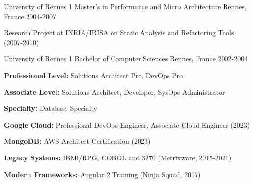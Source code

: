 
\begin{cventries}
\cventry
{University of Rennes 1} %
{Master's in Performance and Micro Architecture} %
{Rennes, France} %
{2004-2007} %
{
  \begin{cvitems}
    \item Research Project at INRIA/IRISA on Static Analysis and Refactoring Tools (2007-2010)
  \end{cvitems}
}
\cventry
{University of Rennes 1} %
{Bachelor of Computer Sciences} %
{Rennes, France} %
{2002-2004} %
{
}
\end{cventries}

\vspace{-2mm}
\begin{cvitems}
\item \textbf{Professional Level:} Solutions Architect Pro, DevOps Pro
\item \textbf{Associate Level:} Solutions Architect, Developer, SysOps Administrator  
\item \textbf{Specialty:} Database Specialty
\end{cvitems}

\vspace{1mm}
\begin{cvitems}
\item \textbf{Google Cloud:} Professional DevOps Engineer, Associate Cloud Engineer (2023)
\item \textbf{MongoDB:} AWS Architect Certification (2023)
\item \textbf{Legacy Systems:} IBMi/RPG, COBOL and 3270 (Metrixware, 2015-2021)
\item \textbf{Modern Frameworks:} Angular 2 Training (Ninja Squad, 2017)
\end{cvitems}

